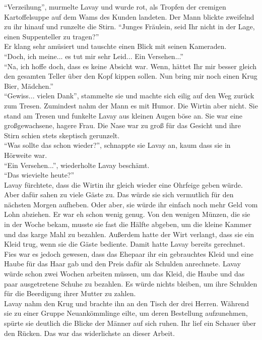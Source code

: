 ``Verzeihung”, murmelte Lavay und wurde rot, als Tropfen der cremigen Kartoffelsuppe auf dem 
Wams des Kunden landeten. Der Mann blickte zweifelnd zu ihr hinauf und runzelte die Stirn.
``Junges Fräulein, seid Ihr nicht in der Lage, einen  Suppenteller zu tragen?”\\
Er klang sehr amüsiert und tauschte einen Blick mit seinen Kameraden.\\
``Doch, ich meine... es tut mir sehr Leid... Ein Versehen...”\\
``Na, ich hoffe doch, dass es keine Absicht war. Wenn, hättet Ihr mir besser gleich den gesamten 
Teller über den Kopf kippen sollen. Nun bring mir noch einen Krug Bier, Mädchen.”\\
``Gewiss... vielen Dank”, stammelte sie und machte sich eilig auf den Weg zurück zum Tresen. 
Zumindest nahm der Mann es mit Humor. Die Wirtin aber nicht. Sie stand am Tresen und funkelte Lavay 
aus kleinen Augen böse an. Sie war eine großgewachsene, hagere Frau. Die Nase war zu groß für das 
Gesicht und ihre Stirn schien stets skeptisch gerunzelt.\\
``Was sollte das schon wieder?”, schnappte sie Lavay an, kaum dass sie in Hörweite war.\\
``Ein Versehen...”, wiederholte Lavay beschämt.\\
``Das wievielte heute?”\\
Lavay fürchtete, dass die Wirtin ihr gleich wieder eine Ohrfeige geben würde. Aber dafür sahen zu 
viele Gäste zu. Das würde sie sich vermutlich für den nächsten Morgen aufheben. Oder aber, sie 
würde ihr einfach noch mehr Geld vom Lohn abziehen. Er war eh schon wenig genug. Von den wenigen 
Münzen, die sie in der Woche bekam, musste sie fast die Hälfte abgeben, um die kleine Kammer und 
das karge Mahl zu bezahlen. Außerdem hatte der Wirt verlangt, dass sie ein Kleid trug, wenn sie die 
Gäste bediente. Damit hatte Lavay bereits gerechnet. Fies war es jedoch gewesen, dass das Ehepaar 
ihr ein gebrauchtes Kleid und eine Haube für das Haar gab und den Preis dafür als Schulden 
anrechnete. Lavay würde schon zwei Wochen arbeiten müssen, um das Kleid, die Haube und das paar 
ausgetretene Schuhe zu bezahlen. Es würde nichts bleiben, um ihre Schulden für die Beerdigung ihrer 
Mutter zu zahlen.\\
Lavay nahm den Krug und brachte ihn an den Tisch der drei Herren. Während sie zu einer Gruppe 
Neuankömmlinge eilte, um deren Bestellung aufzunehmen, spürte sie deutlich die Blicke der Männer 
auf sich ruhen. Ihr lief ein Schauer über den Rücken. Das war das widerlichste an dieser Arbeit. 
